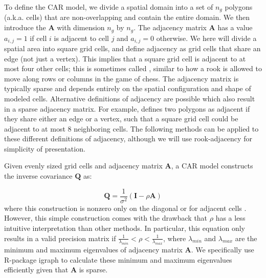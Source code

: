 To define the CAR model, we divide a spatial domain into a set of \( n_g \) polygons (a.k.a. cells) that are non-overlapping and contain the entire domain.  We then  introduce the  \( \mathbf{A} \) with dimension \(n_g\) by \(n_g\).  The adjacency matrix \( \mathbf{A} \) has a value \( a_{i,j} = 1 \) if cell \(i\) is adjacent to cell \(j\) and \( a_{i,j} = 0 \) otherwise.  We here will divide a spatial area into square grid cells, and define adjacency as grid cells that share an edge (not just a vertex).  This implies that a square grid cell is adjacent to at most four other cells;  this is sometimes called , similar to how a rook is allowed to move along rows or columns in the game of chess.  The adjacency matrix is typically sparse and depends entirely on the spatial configuration and shape of modeled cells.  Alternative definitions of adjacency are possible which also result in a sparse adjacency matrix.  For example,  defines two polygons as adjacent if they share either an edge or a vertex, such that a square grid cell could be adjacent to at most 8 neighboring cells.  The following methods can be applied to these different definitions of adjacency, although we will use rook-adjacency for simplicity of presentation.

Given evenly sized grid cells and adjacency matrix \( \mathbf{A} \), a CAR model constructs the inverse covariance \( \mathbf{Q} \) as:

\begin{equation} \label{eq:Chap5_CAR}
    \mathbf{Q} = \frac{1}{\sigma^2} (\mathbf{I} - \rho \mathbf{A})
\end{equation}
where this construction is nonzero only on the diagonal or for adjacent cells \cite{ver_hoef_relationship_2018}.  However, this simple construction comes with the drawback that \( \rho \) has a less intuitive interpretation than other methods.  In particular, this equation only results in a valid precision matrix if \( \frac{1}{\lambda_{min}} < \rho < \frac{1}{\lambda_{max}} \), where \( \lambda_{min} \) and \( \lambda_{max} \) are the minimum and maximum eigenvalues of adjacency matrix \( \mathbf{A} \).  We specifically use R-package \colorbox{backcolour}{igraph} \cite{csardi_igraph_2006} to calculate these minimum and maximum eigenvalues efficiently given that \( \mathbf{A} \) is sparse.  

